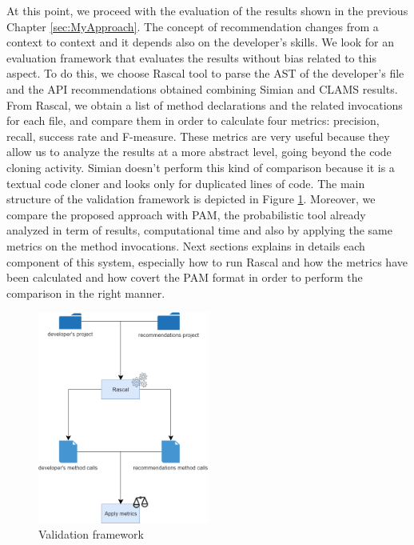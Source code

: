 




At this point, we proceed with the evaluation of the results shown in the previous Chapter \ref{sec:MyApproach}. The concept of recommendation changes from a context to context and it depends also on the developer's skills. We look for an evaluation framework that evaluates the results without bias related to this aspect. To do this, we choose Rascal tool to parse the AST of the developer's file and the API recommendations obtained combining Simian and CLAMS results. From Rascal, we obtain a list of method declarations and the related invocations for each file, and compare them in order to calculate four metrics: precision, recall, success rate and F-measure. These metrics are very useful because they allow us to analyze the results at a more abstract level, going beyond the code cloning activity. Simian doesn't perform this kind of comparison because it is a textual code cloner and looks only for duplicated lines of code. The main structure of the validation framework is depicted in Figure \ref{fig:ValidationFramework}. Moreover, we compare the proposed approach with PAM, the probabilistic tool already analyzed in term of results, computational time and also by applying the same metrics on the method invocations. Next sections explains in details each component of this system, especially how to run Rascal and how the metrics have been calculated and how covert the PAM format in order to perform the comparison in the right manner.


\begin{figure}[!h]
	\centering
	\includegraphics[width=0.50\textwidth]{images/rascal.png}
	\caption{Validation framework}
	 \label{fig:ValidationFramework}
\end{figure}


